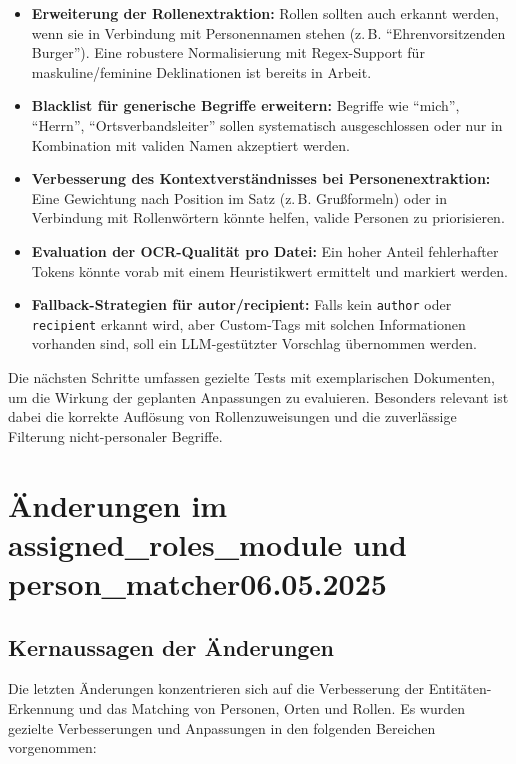 \documentclass{article}
\begin{document}
\begin{itemize}
    \item \textbf{Erweiterung der Rollenextraktion:} Rollen sollten auch erkannt werden, wenn sie in Verbindung mit Personennamen stehen (z.\,B. ``Ehrenvorsitzenden Burger''). Eine robustere Normalisierung mit Regex-Support für maskuline/feminine Deklinationen ist bereits in Arbeit.
    \item \textbf{Blacklist für generische Begriffe erweitern:} Begriffe wie ``mich'', ``Herrn'', ``Ortsverbandsleiter'' sollen systematisch ausgeschlossen oder nur in Kombination mit validen Namen akzeptiert werden.
    \item \textbf{Verbesserung des Kontextverständnisses bei Personenextraktion:} Eine Gewichtung nach Position im Satz (z.\,B. Grußformeln) oder in Verbindung mit Rollenwörtern könnte helfen, valide Personen zu priorisieren.
    \item \textbf{Evaluation der OCR-Qualität pro Datei:} Ein hoher Anteil fehlerhafter Tokens könnte vorab mit einem Heuristikwert ermittelt und markiert werden.
    \item \textbf{Fallback-Strategien für autor/recipient:} Falls kein \texttt{author} oder \texttt{recipient} erkannt wird, aber Custom-Tags mit solchen Informationen vorhanden sind, soll ein LLM-gestützter Vorschlag übernommen werden.
\end{itemize}

Die nächsten Schritte umfassen gezielte Tests mit exemplarischen Dokumenten, um die Wirkung der geplanten Anpassungen zu evaluieren. Besonders relevant ist dabei die korrekte Auflösung von Rollenzuweisungen und die zuverlässige Filterung nicht-personaler Begriffe.


\section{Änderungen im assigned\_roles\_module und person\_matcher\small 06.05.2025}

\subsection*{Kernaussagen der Änderungen}
Die letzten Änderungen konzentrieren sich auf die Verbesserung der Entitäten-Erkennung und das Matching von Personen, Orten und Rollen. Es wurden gezielte Verbesserungen und Anpassungen in den folgenden Bereichen vorgenommen:\\
\end{document}
